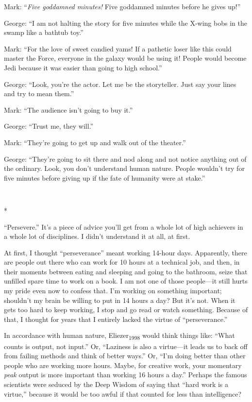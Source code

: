 {
 Mark: ``\textit{Five goddamned minutes!} Five
goddamned minutes before he gives up!''}

{
 George: ``I am not halting the story for five
minutes while the X-wing bobs in the swamp like a bathtub
toy.''}

{
 Mark: ``For the love of sweet candied yams! If a
pathetic loser like this could master the Force, everyone in the galaxy
would be using it! People would become Jedi because it was easier than
going to high school.''}

{
 George: ``Look, you're the actor.
Let me be the storyteller. Just say your lines and try to mean
them.''}

{
 Mark: ``The audience isn't going
to buy it.''}

{
 George: ``Trust me, they
will.''}

{
 Mark: ``They're going to get up
and walk out of the theater.''}

{
 George: ``They're going to sit
there and nod along and not notice anything out of the ordinary. Look,
you don't understand human nature. People
wouldn't try for five minutes before giving up if the
fate of humanity were at stake.''}

{\centering
 \ ~
\par}

{\centering
 *
\par}


{
 ``Persevere.''
It's a piece of advice you'll get from
a whole lot of high achievers in a whole lot of disciplines. I
didn't understand it at all, at first. }

{
 At first, I thought
``perseverance'' meant working
14-hour days. Apparently, there are people out there who can work for
10 hours at a technical job, and then, in their moments between eating
and sleeping and going to the bathroom, seize that unfilled spare time
to work on a book. I am not one of those people---it still hurts my
pride even now to confess that. I'm working on
something important; shouldn't my brain be willing to
put in 14 hours a day? But it's not. When it gets too
hard to keep working, I stop and go read or watch something. Because of
that, I thought for years that I entirely lacked the virtue of
``perseverance.''}

{
 In accordance with human nature, Eliezer\textsubscript{1998} would
think things like: ``What counts is output, not
input.'' Or, ``Laziness is also a
virtue---it leads us to back off from failing methods and think of
better ways.'' Or,
``I'm doing better than other people
who are working more hours. Maybe, for creative work, your momentary
\textit{peak} output is more important than working 16 hours a
day.'' Perhaps the famous scientists were seduced by
the Deep Wisdom of saying that ``hard work is a
virtue,'' because it would be too awful if that
counted for less than intelligence?}

